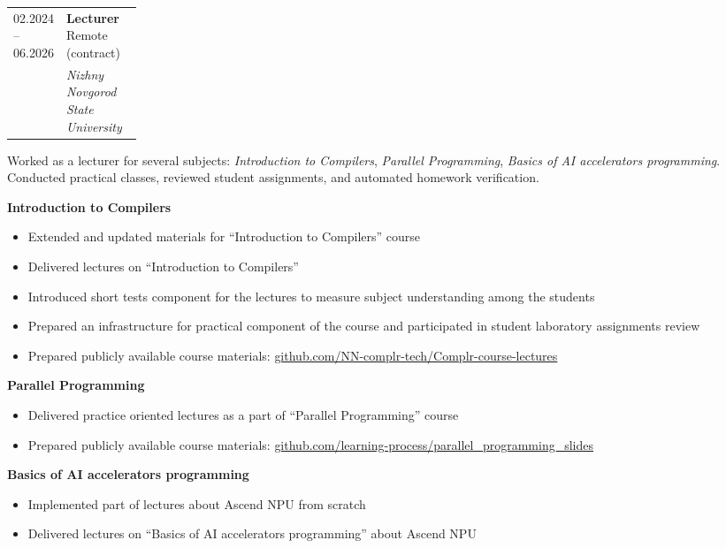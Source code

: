 \documentclass[11pt,a4paper]{article}
\makeatletter
\newcommand{\muted}[1]{{\color{Muted}#1}}
\newcommand{\cventry}[5]{%
  \par\noindent
  \begin{tabularx}{\linewidth}{@{}p{0.17\linewidth}@{\hspace{0.55em}}X@{}}
    \muted{\small #1} &
    {\textbf{#3} \hfill \muted{\small #4}}\\[-0.15em]
    & {\textit{#2}}\\
  \end{tabularx}\par
  #5
  \vspace{0.25em}
}
\newcommand{\cvbullets}[1]{%
  \begin{itemize}[leftmargin=1.4em, labelsep=0.5em]
    #1
  \end{itemize}
}
\newcommand{\cvplain}[1]{%
  \vspace{0.1em}
  \small #1
  \par
}
\makeatother
\begin{document}
\cventry
  {02.2024 -- 06.2026}
  {Nizhny Novgorod State University}
  {Lecturer}
  {Remote (contract)}
  {%
   \cvplain{Worked as a lecturer for several subjects: \textit{Introduction to Compilers}, \textit{Parallel Programming}, \textit{Basics of AI accelerators programming}. Conducted practical classes, reviewed student assignments, and automated homework verification.}
   \vspace{0.1em}
   \textbf{Introduction to Compilers}\par
   \cvbullets{
     \item Extended and updated materials for ``Introduction to Compilers'' course
     \item Delivered lectures on ``Introduction to Compilers''
     \item Introduced short tests component for the lectures to measure subject understanding among the students
     \item Prepared an infrastructure for practical component of the course and participated in student laboratory assignments review
     \item Prepared publicly available course materials: \href{https://github.com/NN-complr-tech/Complr-course-lectures}{github.com/NN-complr-tech/Complr-course-lectures}
   }
   \par
   \textbf{Parallel Programming}\par
   \cvbullets{
     \item Delivered practice oriented lectures as a part of ``Parallel Programming'' course
     \item Prepared publicly available course materials: \href{https://github.com/learning-process/parallel_programming_slides}{github.com/learning-process/parallel\_programming\_slides}
   }
   \par
   \textbf{Basics of AI accelerators programming}\par
   \cvbullets{
     \item Implemented part of lectures about Ascend NPU from scratch
     \item Delivered lectures on ``Basics of AI accelerators programming'' about Ascend NPU
   }
  }
\end{document}
